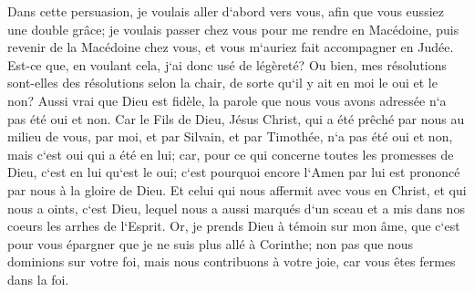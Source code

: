 \verse Dans cette persuasion, je voulais aller d`abord vers vous, afin que vous eussiez une double grâce; 
\verse je voulais passer chez vous pour me rendre en Macédoine, puis revenir de la Macédoine chez vous, et vous m`auriez fait accompagner en Judée. 
\verse Est-ce que, en voulant cela, j`ai donc usé de légèreté? Ou bien, mes résolutions sont-elles des résolutions selon la chair, de sorte qu`il y ait en moi le oui et le non? 
\verse Aussi vrai que Dieu est fidèle, la parole que nous vous avons adressée n`a pas été oui et non. 
\verse Car le Fils de Dieu, Jésus Christ, qui a été prêché par nous au milieu de vous, par moi, et par Silvain, et par Timothée, n`a pas été oui et non, mais c`est oui qui a été en lui; 
\verse car, pour ce qui concerne toutes les promesses de Dieu, c`est en lui qu`est le oui; c`est pourquoi encore l`Amen par lui est prononcé par nous à la gloire de Dieu. 
\verse Et celui qui nous affermit avec vous en Christ, et qui nous a oints, c`est Dieu, 
\verse lequel nous a aussi marqués d`un sceau et a mis dans nos coeurs les arrhes de l`Esprit. 
\verse Or, je prends Dieu à témoin sur mon âme, que c`est pour vous épargner que je ne suis plus allé à Corinthe; 
\verse non pas que nous dominions sur votre foi, mais nous contribuons à votre joie, car vous êtes fermes dans la foi. 

\chapter{}

